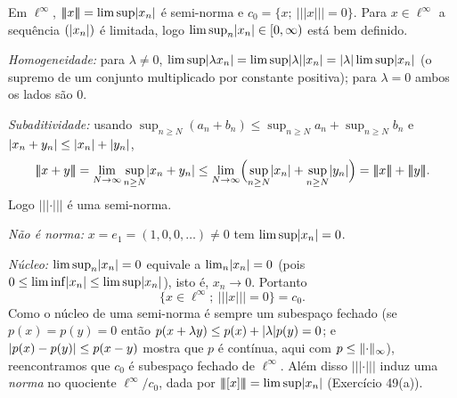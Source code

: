 \begin{exercicio}{Em $\ell^\infty$, $\vert\!\vert\!\vert x\vert\!\vert\!\vert=\limsup\lvert x_n\rvert$ é semi-norma e $c_0=\{x;\ \vert\!\vert\!\vert x\vert\!\vert\!\vert=0\}$.}
\sol
Para $x\in \ell^\infty$ a sequência $(\lvert x_n\rvert)$ é limitada, logo $\limsup_n\lvert x_n\rvert\in[0,\infty)$ está bem definido.

\emph{Homogeneidade:} para $\lambda\neq0$, $\limsup\lvert\lambda x_n\rvert=\limsup\lvert\lambda\rvert\lvert x_n\rvert=\lvert\lambda\rvert\limsup\lvert x_n\rvert$ (o supremo de um conjunto multiplicado por constante positiva); para $\lambda=0$ ambos os lados são $0$.

\emph{Subaditividade:} usando $\sup_{n\ge N}(a_n+b_n)\le \sup_{n\ge N}a_n+\sup_{n\ge N}b_n$ e $\lvert x_n+y_n\rvert\le\lvert x_n\rvert+\lvert y_n\rvert$,
\[ \vert\!\vert\!\vert x+y\vert\!\vert\!\vert=\lim_{N\to\infty}\sup_{n\ge N}\abs{x_n+y_n}\le \lim_{N\to\infty}\Bigl(\sup_{n\ge N}\abs{x_n}+\sup_{n\ge N}\abs{y_n}\Bigr)=\vert\!\vert\!\vert x\vert\!\vert\!\vert+\vert\!\vert\!\vert y\vert\!\vert\!\vert. \]
Logo $\vert\!\vert\!\vert\cdot\vert\!\vert\!\vert$ é uma semi-norma.

\emph{Não é norma:} $x=e_1=(1,0,0,\dots)\neq0$ tem $\limsup\lvert x_n\rvert=0$.

\emph{Núcleo:} $\limsup_n\lvert x_n\rvert=0$ equivale a $\lim_n\lvert x_n\rvert=0$ (pois $0\le\liminf\lvert x_n\rvert\le\limsup\lvert x_n\rvert$), isto é, $x_n\to0$. Portanto
\[ \{x\in \ell^\infty;\ \vert\!\vert\!\vert x\vert\!\vert\!\vert=0\}=c_0. \]
Como o núcleo de uma semi-norma é sempre um subespaço fechado (se $p(x)=p(y)=0$ então $p(x+\lambda y)\le p(x)+\lvert\lambda\rvert p(y)=0$; e $\lvert p(x)-p(y)\rvert\le p(x-y)$ mostra que $p$ é contínua, aqui com $p\le\lVert\cdot\rVert_\infty$), reencontramos que $c_0$ é subespaço fechado de $\ell^\infty$. Além disso $\vert\!\vert\!\vert\cdot\vert\!\vert\!\vert$ induz uma \emph{norma} no quociente $\ell^\infty/c_0$, dada por $\vert\!\vert\!\vert[x]\vert\!\vert\!\vert=\limsup\lvert x_n\rvert$ (Exercício 49(a)).
\end{exercicio}

